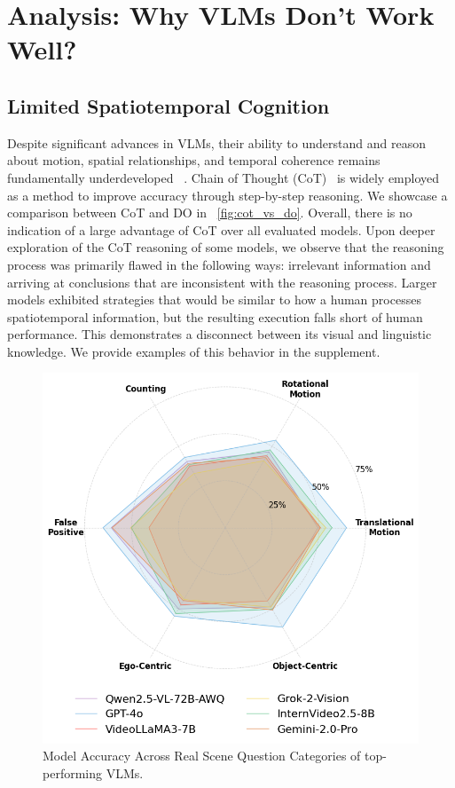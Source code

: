 \section{Analysis: Why VLMs Don't Work Well?}

\subsection{Limited Spatiotemporal Cognition}
Despite significant advances in VLMs, their ability to understand and reason about motion, spatial relationships, and temporal coherence remains fundamentally underdeveloped ~\cite{chen2024we, apollo}. Chain of Thought (CoT)~\cite{wei2022chain} is widely employed as a method to improve accuracy through step-by-step reasoning. We showcase a comparison between CoT and DO in ~\cref{fig:cot_vs_do}. Overall, there is no indication of a large advantage of CoT over all evaluated models. Upon deeper exploration of the CoT reasoning of some models, we observe that the reasoning process was primarily flawed in the following ways: irrelevant information and arriving at conclusions that are inconsistent with the reasoning process. Larger models exhibited strategies that would be similar to how a human processes spatiotemporal information, but the resulting execution falls short of human performance. This demonstrates a disconnect between its visual and linguistic knowledge. We provide examples of this behavior in the supplement. 

\begin{figure}
    \centering
    \includegraphics[width=1\linewidth]{figures/radar_plot.png}
    \caption{Model Accuracy Across Real Scene Question Categories of top-performing VLMs.}
    \label{fig:radar_plot}
    \vspace{-0.3cm}
\end{figure}

